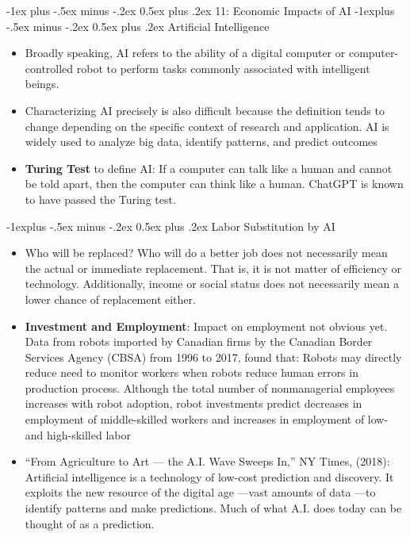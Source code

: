 \documentclass[12pt, landscape]{article}
\makeatletter
\renewcommand{\section}{\@startsection{section}{1}{0mm}%
                                {-1ex plus -.5ex minus -.2ex}%
                                {0.5ex plus .2ex}%
                                {\normalfont\large\bfseries}}
\renewcommand{\subsection}{\@startsection{subsection}{2}{0mm}%
                                {-1explus -.5ex minus -.2ex}%
                                {0.5ex plus .2ex}%
                                {\normalfont\normalsize\bfseries}}
\makeatother
\begin{document}
\begin{multicols*}{3}
\vfill\null
\columnbreak


\section{11: Economic Impacts of AI}
\subsection{Artificial Intelligence}
\begin{itemize}
\item Broadly speaking, AI refers to the ability of a digital computer or computer-controlled robot to perform tasks commonly associated with intelligent beings.
\item Characterizing AI precisely is also difficult because the definition tends to change depending on the specific context of research and application. AI is widely used to analyze big data, identify patterns, and predict outcomes
\item \textbf{Turing Test} to define AI: If a computer can talk like a human and cannot be told apart, then the computer can think like a human. ChatGPT is known to have passed the Turing test.
\end{itemize}
\subsection{Labor Substitution by AI}
\begin{itemize}
\item Who will be replaced? Who will do a better job does not necessarily mean the actual or immediate replacement. That is, it is not matter of efficiency or technology. Additionally, income or social status does not necessarily mean a lower chance of replacement either.
\item \textbf{Investment and Employment}: Impact on employment not obvious yet. Data from robots imported by Canadian firms by the Canadian Border Services Agency (CBSA) from 1996 to 2017, found that: Robots may directly reduce need to monitor workers when robots reduce human errors in production process. Although the total number of nonmanagerial employees increases with robot adoption, robot investments predict decreases in employment of middle-skilled workers and increases in employment of low- and high-skilled labor
\item “From Agriculture to Art — the A.I. Wave Sweeps In,” NY Times, (2018): Artificial intelligence is a technology of low-cost prediction and discovery. It exploits the new resource of the digital age —vast amounts of data —to identify patterns and make predictions. Much of what A.I. does today can be thought of as a prediction.
\end{itemize}

\end{multicols*}
\end{document}
